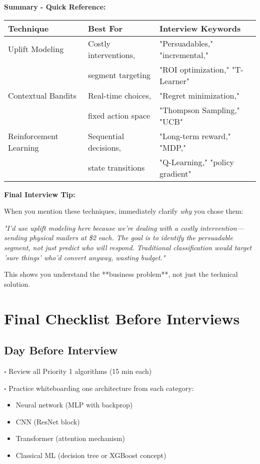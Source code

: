 \documentclass[10pt]{article}
\begin{document}
\textbf{Summary - Quick Reference:}

\begin{tabular}{|l|l|l|}
\hline
\textbf{Technique} & \textbf{Best For} & \textbf{Interview Keywords} \\
\hline
Uplift Modeling & Costly interventions, & "Persuadables," "incremental," \\
 & segment targeting & "ROI optimization," "T-Learner" \\
\hline
Contextual Bandits & Real-time choices, & "Regret minimization," \\
 & fixed action space & "Thompson Sampling," "UCB" \\
\hline
Reinforcement Learning & Sequential decisions, & "Long-term reward," "MDP," \\
 & state transitions & "Q-Learning," "policy gradient" \\
\hline
\end{tabular}

\textbf{Final Interview Tip:}

When you mention these techniques, immediately clarify \textit{why} you chose them:

\textit{"I'd use uplift modeling here because we're dealing with a costly intervention—sending physical mailers at \$2 each. The goal is to identify the persuadable segment, not just predict who will respond. Traditional classification would target 'sure things' who'd convert anyway, wasting budget."}

This shows you understand the **business problem**, not just the technical solution.

\section{Final Checklist Before Interviews}

\subsection{Day Before Interview}

$\square$ Review all Priority 1 algorithms (15 min each)

$\square$ Practice whiteboarding one architecture from each category:
\begin{itemize}
\item Neural network (MLP with backprop)
\item CNN (ResNet block)
\item Transformer (attention mechanism)
\item Classical ML (decision tree or XGBoost concept)
\end{itemize}
\end{document}
